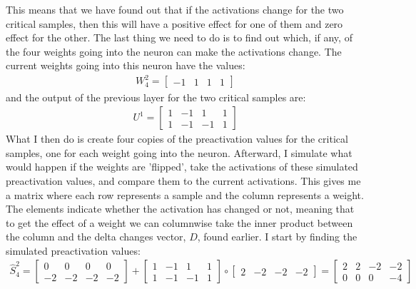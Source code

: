 This means that we have found out that if the activations change for the two critical samples, then this will have a positive effect for one of them and zero effect for the other. The last thing we need to do is to find out which, if any, of the four weights going into the neuron can make the activations change. The current weights going into this neuron have the values: 
\begin{align*}
    W_4^2 = 
    \begin{bmatrix}
        -1 & 1 & 1 & 1
    \end{bmatrix}
\end{align*}
and the output of the previous layer for the two critical samples are:
\begin{align*}
    U^1 = 
    \begin{bmatrix}
        1 & -1 & 1 & 1 \\
        1 & -1 & -1 & 1
    \end{bmatrix}
\end{align*}
What I then do is create four copies of the preactivation values for the critical samples, one for each weight going into the neuron. Afterward, I simulate what would happen if the weights are 'flipped', take the activations of these simulated preactivation values, and compare them to the current activations. This gives me a matrix where each row represents a sample and the column represents a weight. The elements indicate whether the activation has changed or not, meaning that to get the effect of a weight we can columnwise take the inner product between the column and the delta changes vector, $D$, found earlier. I start by finding the simulated preactivation values:
\begin{align*}
    \hat{S}^2_4 = 
    \begin{bmatrix}
        0 & 0 & 0 & 0 \\
        -2 & -2 & -2 & -2
    \end{bmatrix}
    + 
    \begin{bmatrix}
        1 & -1 & 1 & 1 \\
        1 & -1 & -1 & 1
    \end{bmatrix}
    \circ 
    \begin{bmatrix}
        2 & -2 & -2 & -2
    \end{bmatrix}
    =
    \begin{bmatrix}
        2 & 2 & -2 & -2 \\
        0 & 0 & 0 & -4
    \end{bmatrix}
\end{align*}
